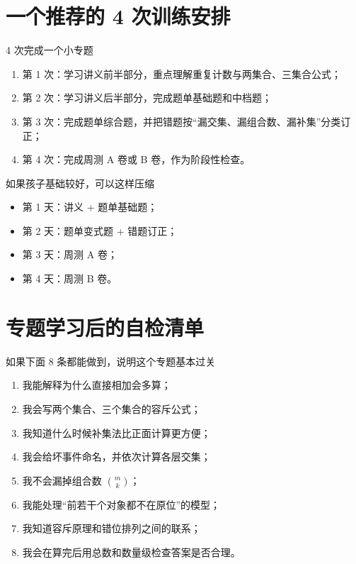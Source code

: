 \documentclass[11pt,a4paper,fontset=fandol]{ctexart}
\begin{document}
\section{一个推荐的 4 次训练安排}

\begin{goalbox}{4 次完成一个小专题}
\begin{enumerate}
  \item 第 1 次：学习讲义前半部分，重点理解重复计数与两集合、三集合公式；
  \item 第 2 次：学习讲义后半部分，完成题单基础题和中档题；
  \item 第 3 次：完成题单综合题，并把错题按“漏交集、漏组合数、漏补集”分类订正；
  \item 第 4 次：完成周测 A 卷或 B 卷，作为阶段性检查。
\end{enumerate}
\end{goalbox}

\begin{infobox}{如果孩子基础较好，可以这样压缩}
\begin{itemize}
  \item 第 1 天：讲义 + 题单基础题；
  \item 第 2 天：题单变式题 + 错题订正；
  \item 第 3 天：周测 A 卷；
  \item 第 4 天：周测 B 卷。
\end{itemize}
\end{infobox}

\section{专题学习后的自检清单}

\begin{goalbox}{如果下面 8 条都能做到，说明这个专题基本过关}
\begin{enumerate}
  \item 我能解释为什么直接相加会多算；
  \item 我会写两个集合、三个集合的容斥公式；
  \item 我知道什么时候补集法比正面计算更方便；
  \item 我会给坏事件命名，并依次计算各层交集；
  \item 我不会漏掉组合数 $\binom{m}{k}$；
  \item 我能处理“前若干个对象都不在原位”的模型；
  \item 我知道容斥原理和错位排列之间的联系；
  \item 我会在算完后用总数和数量级检查答案是否合理。
\end{enumerate}
\end{goalbox}
\end{document}
